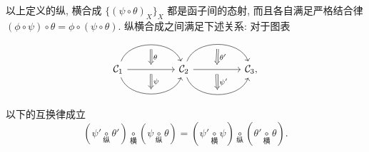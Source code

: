 \begin{lemma}\label{prop:naturaltrans-associativity}
	以上定义的纵, 横合成 $\{ (\psi \circ \theta)_X \}_X$ 都是函子间的态射, 而且各自满足严格结合律 $(\phi \circ \psi) \circ \theta = \phi \circ (\psi \circ \theta)$. 纵横合成之间满足下述关系: 对于图表
	\[\begin{tikzcd}
		\mathcal{C}_1
		\arrow[bend left=70, rr, ""' name=U]
		\arrow[rr, "" name=MM, ""' name=M]
		\arrow[bend right=70, rr, "" name=D] & &
		\arrow[Rightarrow, to path=(U) -- (MM) \tikztonodes, "\theta"] \arrow[Rightarrow, to path=  (M) -- (D) \tikztonodes, "\psi"] \mathcal{C}_2
		\arrow[bend left=70, rr, ""' name=V]
		\arrow[rr, "" name=NN, ""' name=N]
		\arrow[bend right=70, rr, "" name=E] & &
		\arrow[Rightarrow, to path=(V) -- (NN) \tikztonodes, "\theta'"] \arrow[Rightarrow, to path=  (N) -- (E) \tikztonodes, "\psi'"] \mathcal{C}_3 ,
	\end{tikzcd} \]
	以下的互换律成立
	\[ \left( \psi' \underset{\text{纵}}{\circ} \theta'\right) \underset{\text{横}}{\circ} \left( \psi \underset{\text{纵}}{\circ} \theta\right) = \left( \psi' \underset{\text{横}}{\circ} \psi \right) \underset{\text{纵}}{\circ} \left( \theta' \underset{\text{横}}{\circ} \theta\right).  \]
\end{lemma}

